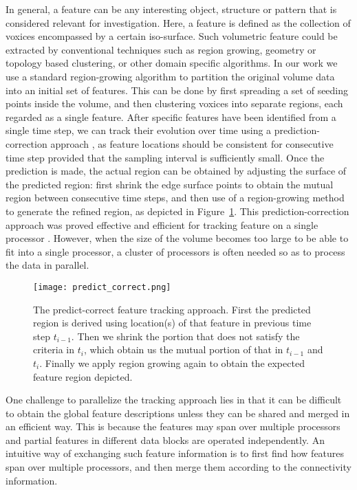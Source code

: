 In general, a feature can be any interesting object, structure or pattern that is considered relevant for investigation. Here, a feature is defined as the collection of voxices encompassed by a certain iso-surface. Such volumetric feature could be extracted by conventional techniques such as region growing, geometry or topology based clustering, or other domain specific algorithms. In our work we use a standard region-growing algorithm
\cite{Huang2003} to partition the original volume data into an initial set of features. This can be done by first spreading a set of seeding points inside the volume, and then clustering voxices into separate regions, each regarded as a single feature. After specific features have been identified from a single time step, we can track their evolution over time using a prediction-correction approach \cite{Muelder2009}, as feature locations should be consistent for consecutive time step provided that the sampling interval is sufficiently small. Once the prediction is made, the actual region can be obtained by adjusting the surface of the predicted region: first shrink the edge surface points to obtain the mutual region between consecutive time steps, and then use of a region-growing method to generate the refined region, as depicted in Figure~\ref{fig:predict-correct}. This prediction-correction approach was proved effective and efficient for tracking feature on a single processor \cite{Muelder2009}. However, when the size of the volume becomes too large to be able to fit into a single processor, a cluster of processors is often needed so as to process the data in parallel.

\begin{figure}[ht]
	\centering
	\texttt{[image: predict\_correct.png]}
	\caption{The predict-correct feature tracking approach. First the predicted region is derived using location(s) of that feature in previous time step $t_{i-1}$. Then we shrink the portion that does not satisfy the criteria in $t_i$, which obtain us the mutual portion of that in $t_{i-1}$ and $t_i$. Finally we apply region growing again to obtain the expected feature region depicted.}
	\label{fig:predict-correct}
\end{figure}

One challenge to parallelize the tracking approach lies in that it can be difficult to obtain the global feature descriptions unless they can be shared and merged in an efficient way. This is because the features may span over multiple processors and partial features in different data blocks are operated independently. An intuitive way of exchanging such feature information is to first find how features span over multiple processors, and then merge them according to the connectivity information.

